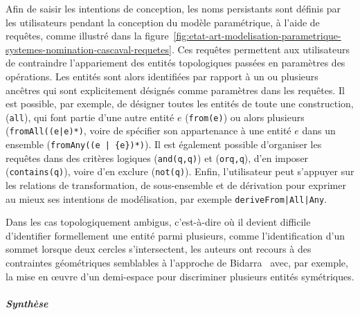 Afin de saisir les intentions de conception, les noms persistants sont définis
par les utilisateurs pendant la conception du modèle paramétrique, à l'aide de
requêtes, comme illustré dans la
figure~\ref{fig:etat-art-modelisation-parametrique-systemes-nomination-cascaval-requetes}. %
Ces requêtes permettent aux utilisateurs de contraindre l'appariement des
entités topologiques passées en paramètres des opérations. %
Les entités sont alors identifiées par rapport à un ou plusieurs ancêtres qui
sont explicitement désignés comme paramètres dans les requêtes. %
Il est possible, par exemple, de désigner toutes les entités de toute une
construction, (\texttt{all}), qui font partie d'une autre entité \(e\)
(\texttt{from(e)}) ou alors plusieurs (\texttt{fromAll((e|{e})*)}, voire de
spécifier son appartenance à une entité \(e\) dans un ensemble
(\texttt{fromAny((e | \{e\})*)}). %
Il est également possible d'organiser les requêtes dans des critères logiques
(\texttt{and(q,q)}) et (\texttt{or{q,q}}), d'en imposer (\texttt{contains(q)}),
voire d'en exclure (\texttt{not(q)}). %
Enfin, l'utilisateur peut s'appuyer sur les relations de transformation, de
sous-ensemble et de dérivation pour exprimer au mieux ses intentions de
modélisation, par exemple \texttt{deriveFrom|All|Any}. %

Dans les cas topologiquement ambigus, c'est-à-dire où il devient difficile
d'identifier formellement une entité parmi plusieurs, comme l'identification
d'un sommet lorsque deux cercles s'intersectent, les auteurs ont recours à des
contraintes géométriques semblables à l'approche de
Bidarra~\cite{bidarra2005feature} avec, par exemple, la mise en \oe uvre d'un
demi-espace pour discriminer plusieurs entités symétriques. %







\subparagraph*{Synthèse}


